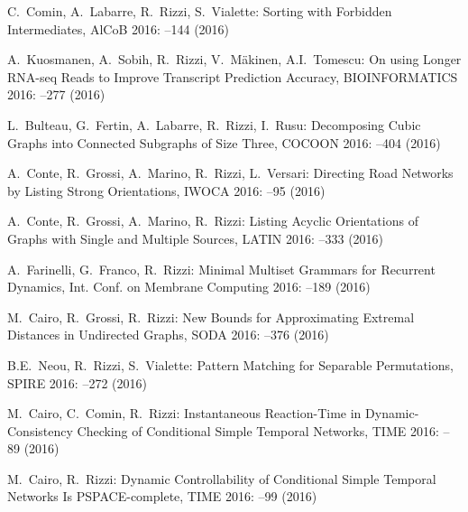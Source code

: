 \begin{etaremune}
  \item {\sc C.~Comin, A.~Labarre, R.~Rizzi, S.~Vialette:}
   \newblock Sorting with Forbidden Intermediates,
   \newblock AlCoB 2016:
   --144 (2016)

  \item {\sc A.~Kuosmanen, A.~Sobih, R.~Rizzi, V.~Mäkinen, A.I.~Tomescu:}
   \newblock On using Longer RNA-seq Reads to Improve Transcript Prediction Accuracy,
   \newblock BIOINFORMATICS 2016:
   --277 (2016)

  \item {\sc L.~Bulteau, G.~Fertin, A.~Labarre, R.~Rizzi, I.~Rusu:}
   \newblock Decomposing Cubic Graphs into Connected Subgraphs of Size Three,
   \newblock COCOON 2016:
   --404 (2016)

  \item {\sc A.~Conte, R.~Grossi, A.~Marino, R.~Rizzi, L.~Versari:}
   \newblock Directing Road Networks by Listing Strong Orientations,
   \newblock IWOCA 2016:
   --95 (2016)

  \item {\sc A.~Conte, R.~Grossi, A.~Marino, R.~Rizzi:}
   \newblock Listing Acyclic Orientations of Graphs with Single and Multiple Sources,
   \newblock LATIN 2016:
   --333 (2016)

  \item {\sc A.~Farinelli, G.~Franco, R.~Rizzi:}
   \newblock Minimal Multiset Grammars for Recurrent Dynamics,
   \newblock Int. Conf. on Membrane Computing 2016:
   --189 (2016)

  \item {\sc M.~Cairo, R.~Grossi, R.~Rizzi:}
   \newblock New Bounds for Approximating Extremal Distances in Undirected Graphs,
   \newblock SODA 2016:
   --376 (2016)

  \item {\sc B.E.~Neou, R.~Rizzi, S.~Vialette:}
   \newblock Pattern Matching for Separable Permutations,
   \newblock SPIRE 2016:
   --272 (2016)

  \item {\sc M.~Cairo, C.~Comin, R.~Rizzi:}
   \newblock Instantaneous Reaction-Time in Dynamic-Consistency Checking of Conditional Simple Temporal Networks,
   \newblock TIME 2016:
   --89 (2016)

  \item {\sc M.~Cairo, R.~Rizzi:}
   \newblock Dynamic Controllability of Conditional Simple Temporal Networks Is PSPACE-complete,
   \newblock TIME 2016:
   --99 (2016)


\end{etaremune}

